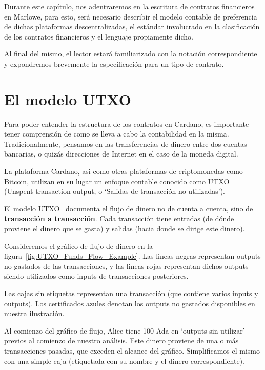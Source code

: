 \documentclass[12pt]{book}
\begin{document}
Durante este capítulo, nos adentraremos en la escritura de contratos financieros en Marlowe, para esto, será necesario describir el modelo contable de preferencia de dichas plataformas descentralizadas, el estándar involucrado en la clasificación de los contratos financieros y el lenguaje propiamente dicho.

Al final del mismo, el lector estará familiarizado con la notación correspondiente y expondremos brevemente la especificación para un tipo de contrato.

\section{El modelo UTXO} %

Para poder entender la estructura de los contratos en Cardano, es importante tener comprensión de como se lleva a cabo la contabilidad en la misma.
Tradicionalmente, pensamos en las transferencias de dinero entre dos cuentas bancarias, o quizás direcciones de Internet en el caso de la moneda digital.

La plataforma Cardano, asi como otras plataformas de criptomonedas como Bitcoin, utilizan en su lugar un enfoque contable conocido como UTXO~\cite{cardano_utxo_ledger} (Unspent transaction output, o `Salidas de transacción no utilizadas').

El modelo UTXO~\cite{Translating_and_Unifying_UTXO-based}\cite{UTxO_Lars} documenta el flujo de dinero no de cuenta a cuenta, sino de \textbf{transacción a transacción}. Cada transacción tiene entradas (de dónde proviene el dinero que se gasta) y salidas (hacia donde se dirige este dinero).

Consideremos el gráfico de flujo de dinero en la figura~\ref{fig:UTXO_Funds_Flow_Example}. Las lineas negras representan outputs no gastados de las transacciones, y las lineas rojas representan dichos outputs siendo utilizados como inputs de transacciones posteriores.

Las cajas sin etiquetas representan una transacción (que contiene varios inputs y outputs). Los certificados azules denotan los outputs no gastados disponibles en nuestra ilustración.

Al comienzo del gráfico de flujo, Alice tiene 100 Ada en `outputs sin utilizar' previos al comienzo de nuestro análisis. Este dinero proviene de una o más transacciones pasadas, que exceden el alcance del gráfico. Simplificamos el mismo con una simple caja (etiquetada con su nombre y el dinero correspondiente).
\end{document}
